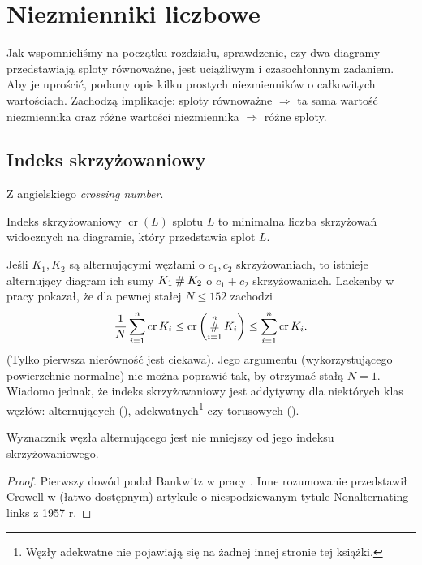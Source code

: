 \section{Niezmienniki liczbowe}
Jak wspomnieliśmy na początku rozdziału, sprawdzenie,
czy dwa diagramy przedstawiają sploty równoważne,
jest uciążliwym i czasochłonnym zadaniem.
Aby je uprościć, podamy opis kilku prostych niezmienników o całkowitych wartościach.
Zachodzą implikacje:
sploty równoważne $\Rightarrow$ ta sama wartość niezmiennika
oraz różne wartości niezmiennika $\Rightarrow$ różne sploty.

\subsection{Indeks skrzyżowaniowy} %
\label{sub:crossing_number}
Z angielskiego \emph{crossing number}.

\begin{definition}
    Indeks skrzyżowaniowy $\operatorname{cr}(L)$ splotu $L$ to
    minimalna liczba skrzyżowań widocznych na diagramie,
    który przedstawia splot $L$.
\end{definition}

Jeśli $K_1, K_2$ są alternującymi węzłami o $c_1, c_2$ skrzyżowaniach, to istnieje alternujący diagram ich sumy $K_1 \mathbin{\#} K_2$ o $c_1 + c_2$ skrzyżowaniach.
Lackenby w pracy \cite{lackenby09} pokazał, że dla pewnej stałej $N \le 152$ zachodzi
\[
    \frac 1 N \sum_{i=1}^n \operatorname{cr} K_i \le \operatorname{cr} \left(\operatorname*{\#}_{i=1}^n K_i\right) \le \sum_{i=1}^n \operatorname{cr} K_i.
\]
(Tylko pierwsza nierówność jest ciekawa).
Jego argumentu (wykorzystującego powierzchnie normalne) nie można poprawić tak, by otrzymać stałą $N = 1$.
Wiadomo jednak, że indeks skrzyżowaniowy jest addytywny dla niektórych klas węzłów: alternujących (\cite{kauffman88}), adekwatnych\footnote{Węzły adekwatne nie pojawiają się na żadnej innej stronie tej książki.} czy torusowych (\cite{gruber03}).

\begin{theorem}[Bankwitz, 1930] \label{thm:bankwitz}
	Wyznacznik węzła alternującego jest nie mniejszy od jego indeksu skrzyżowaniowego.
\end{theorem}

\begin{proof}
	Pierwszy dowód podał Bankwitz w pracy \cite{bankwitz30}.
	Inne rozumowanie przedstawił Crowell w (łatwo dostępnym) artykule o niespodziewanym tytule Nonalternating links z 1957 r.
\end{proof}

